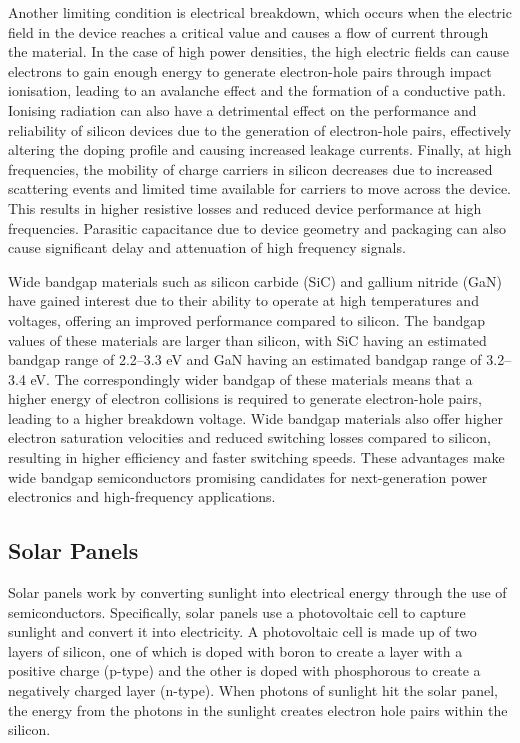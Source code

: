 Another limiting condition is electrical breakdown, which occurs when the electric field in the device reaches a critical value and causes a flow of current through the material. In the case of high power densities, the high electric fields can cause electrons to gain enough energy to generate electron-hole pairs through impact ionisation, leading to an avalanche effect and the formation of a conductive path. Ionising radiation can also have a detrimental effect on the performance and reliability of silicon devices due to the generation of electron-hole pairs, effectively altering the doping profile and causing increased leakage currents. Finally, at high frequencies, the mobility of charge carriers in silicon decreases due to increased scattering events and limited time available for carriers to move across the device. This results in higher resistive losses and reduced device performance at high frequencies. Parasitic capacitance due to device geometry and packaging can also cause significant delay and attenuation of high frequency signals.

Wide bandgap materials such as silicon carbide (SiC) and gallium nitride (GaN) have gained interest due to their ability to operate at high temperatures and voltages, offering an improved performance compared to silicon. The bandgap values of these materials are larger than silicon, with SiC having an estimated bandgap range of 2.2--3.3 eV and GaN having an estimated bandgap range of 3.2--3.4 eV. The correspondingly wider bandgap of these materials means that a higher energy of electron collisions is required to generate electron-hole pairs, leading to a higher breakdown voltage. Wide bandgap materials also offer higher electron saturation velocities and reduced switching losses compared to silicon, resulting in higher efficiency and faster switching speeds. These advantages make wide bandgap semiconductors promising candidates for next-generation power electronics and high-frequency applications.
\subsection{Solar Panels}
Solar panels work by converting sunlight into electrical energy through the use of semiconductors. Specifically, solar panels use a photovoltaic cell to capture sunlight and convert it into electricity. A photovoltaic cell is made up of two layers of silicon, one of which is doped with boron to create a layer with a positive charge (p-type) and the other is doped with phosphorous to create a negatively charged layer (n-type). When photons of sunlight hit the solar panel, the energy from the photons in the sunlight creates electron hole pairs within the silicon. 

